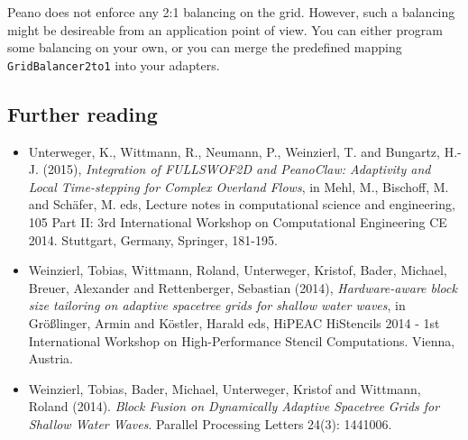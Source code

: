 \begin{remark}
Peano does not enforce any 2:1 balancing on the grid. However, such a balancing
might be desireable from an application point of view. You can either program
some balancing on your own, or you can merge the predefined mapping
\texttt{GridBalancer2to1} into your adapters.
\end{remark}




\subsection*{Further reading}

\begin{itemize}
  \item   Unterweger, K., Wittmann, R., Neumann, P., Weinzierl, T. and Bungartz,
  H.-J.
(2015), {\em Integration of FULLSWOF2D and PeanoClaw: Adaptivity and Local
Time-stepping for Complex Overland Flows}, in Mehl, M., Bischoff, M. and Sch\"afer,
M. eds, Lecture notes in computational science and engineering, 105 Part II: 3rd International Workshop on Computational Engineering CE 2014. Stuttgart, Germany, Springer, 181-195.
\item Weinzierl, Tobias, Wittmann, Roland, Unterweger, Kristof, Bader, Michael,
Breuer, Alexander and Rettenberger, Sebastian (2014), {\em Hardware-aware block
size tailoring on adaptive spacetree grids for shallow water waves}, in
Gr\"o\ss linger, Armin and K\"ostler, Harald eds, HiPEAC HiStencils 2014 - 1st
International Workshop on High-Performance Stencil Computations. Vienna, Austria.
\item Weinzierl, Tobias, Bader, Michael, Unterweger, Kristof and Wittmann,
Roland (2014). {\em Block Fusion on Dynamically Adaptive Spacetree Grids for
Shallow Water Waves}. Parallel Processing Letters 24(3): 1441006.
\end{itemize}



